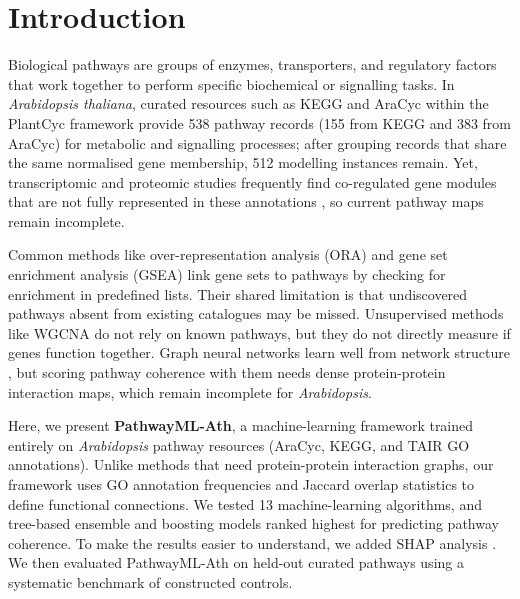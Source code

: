 \documentclass[12pt,twoside]{article}
\begin{document}
\newpage

\section{Introduction}
\label{sec:intro}

Biological pathways are groups of enzymes, transporters, and regulatory factors that work together to perform specific biochemical or signalling tasks. In \textit{Arabidopsis thaliana}, curated resources such as KEGG \citep{kanehisa2023kegg} and AraCyc within the PlantCyc framework \citep{hawkins2021plant} provide 538 pathway records (155 from KEGG and 383 from AraCyc) for metabolic and signalling processes; after grouping records that share the same normalised gene membership, 512 modelling instances remain. Yet, transcriptomic and proteomic studies frequently find co-regulated gene modules that are not fully represented in these annotations \citep{obayashi2018atted,usadel2009coexpression}, so current pathway maps remain incomplete.


Common methods like over-representation analysis (ORA) and gene set enrichment analysis (GSEA) \citep{subramanian2005gsea,khatri2012ten} link gene sets to pathways by checking for enrichment in predefined lists. Their shared limitation is that undiscovered pathways absent from existing catalogues may be missed. Unsupervised methods like WGCNA \citep{langfelder2008wgcna,liesecke2018ranking} do not rely on known pathways, but they do not directly measure if genes function together. Graph neural networks learn well from network structure \citep{muzio2021biological}, but scoring pathway coherence with them needs dense protein-protein interaction maps, which remain incomplete for \textit{Arabidopsis}.


Here, we present \textbf{PathwayML-Ath}, a machine-learning framework trained entirely on \textit{Arabidopsis} pathway resources (AraCyc, KEGG, and TAIR GO annotations). Unlike methods that need protein-protein interaction graphs, our framework uses GO annotation frequencies and Jaccard overlap statistics to define functional connections. We tested 13 machine-learning algorithms, and tree-based ensemble and boosting models ranked highest for predicting pathway coherence. To make the results easier to understand, we added SHAP analysis \citep{lundberg2017unified,strudwick2025autoxai4omics}. We then evaluated PathwayML-Ath on held-out curated pathways using a systematic benchmark of constructed controls.
\end{document}
